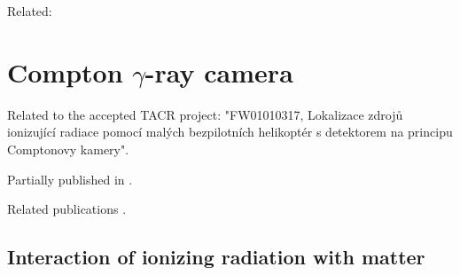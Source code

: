 \documentclass[a4paper,11pt,titlepage,twoside]{book}
\newcommand{\chapternoclear}[1]{
  \begingroup
  \let\cleardoublepage\clearpage
  \chapter{#1}
  \endgroup
}
\begin{document}
Related: \cite{baca2019timepix}




\chapternoclear{Compton $\gamma$-ray camera}

Related to the accepted TACR project: "FW01010317, Lokalizace zdrojů ionizující radiace pomocí malých bezpilotních helikoptér s detektorem na principu Comptonovy kamery".

Partially published in \cite{baca2019timepix}.

Related publications \cite{baca2019timepix, stibinger2020localization, baca2018rospix}.


\section{Interaction of ionizing radiation with matter}
\end{document}
